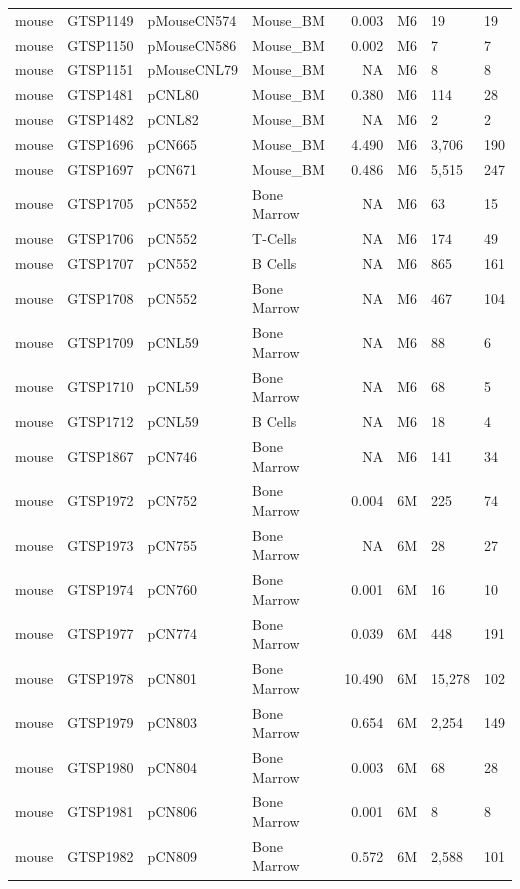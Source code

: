 \documentclass[12pt,]{article}
\begin{document}
\begin{table}[H]
{\begin{tabular}{llllrlll}
mouse & GTSP1149 & pMouseCN574 & Mouse\_BM & 0.003 & M6 & 19 & 19\\
mouse & GTSP1150 & pMouseCN586 & Mouse\_BM & 0.002 & M6 & 7 & 7\\
mouse & GTSP1151 & pMouseCNL79 & Mouse\_BM & NA & M6 & 8 & 8\\
mouse & GTSP1481 & pCNL80 & Mouse\_BM & 0.380 & M6 & 114 & 28\\
mouse & GTSP1482 & pCNL82 & Mouse\_BM & NA & M6 & 2 & 2\\
mouse & GTSP1696 & pCN665 & Mouse\_BM & 4.490 & M6 & 3,706 & 190\\
mouse & GTSP1697 & pCN671 & Mouse\_BM & 0.486 & M6 & 5,515 & 247\\
mouse & GTSP1705 & pCN552 & Bone Marrow & NA & M6 & 63 & 15\\
mouse & GTSP1706 & pCN552 & T-Cells & NA & M6 & 174 & 49\\
mouse & GTSP1707 & pCN552 & B Cells & NA & M6 & 865 & 161\\
mouse & GTSP1708 & pCN552 & Bone Marrow & NA & M6 & 467 & 104\\
mouse & GTSP1709 & pCNL59 & Bone Marrow & NA & M6 & 88 & 6\\
mouse & GTSP1710 & pCNL59 & Bone Marrow & NA & M6 & 68 & 5\\
mouse & GTSP1712 & pCNL59 & B Cells & NA & M6 & 18 & 4\\
mouse & GTSP1867 & pCN746 & Bone Marrow & NA & M6 & 141 & 34\\
mouse & GTSP1972 & pCN752 & Bone Marrow & 0.004 & 6M & 225 & 74\\
mouse & GTSP1973 & pCN755 & Bone Marrow & NA & 6M & 28 & 27\\
mouse & GTSP1974 & pCN760 & Bone Marrow & 0.001 & 6M & 16 & 10\\
mouse & GTSP1977 & pCN774 & Bone Marrow & 0.039 & 6M & 448 & 191\\
mouse & GTSP1978 & pCN801 & Bone Marrow & 10.490 & 6M & 15,278 & 102\\
mouse & GTSP1979 & pCN803 & Bone Marrow & 0.654 & 6M & 2,254 & 149\\
mouse & GTSP1980 & pCN804 & Bone Marrow & 0.003 & 6M & 68 & 28\\
mouse & GTSP1981 & pCN806 & Bone Marrow & 0.001 & 6M & 8 & 8\\
mouse & GTSP1982 & pCN809 & Bone Marrow & 0.572 & 6M & 2,588 & 101\\
\bottomrule
\end{tabular}}
\end{table}
\end{document}
